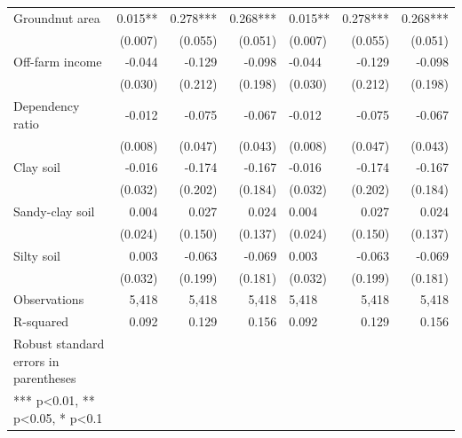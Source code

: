 \documentclass[
]{article}
\begin{document}
\begin{longtable}[t]{lrrrlrr}
Groundnut area & 0.015** & 0.278*** & 0.268*** & 0.015** & 0.278*** & 0.268***\\
 & (0.007) & (0.055) & (0.051) & (0.007) & (0.055) & (0.051)\\
Off-farm income & -0.044 & -0.129 & -0.098 & -0.044 & -0.129 & -0.098\\
 & (0.030) & (0.212) & (0.198) & (0.030) & (0.212) & (0.198)\\
Dependency ratio & -0.012 & -0.075 & -0.067 & -0.012 & -0.075 & -0.067\\
 & (0.008) & (0.047) & (0.043) & (0.008) & (0.047) & (0.043)\\
Clay soil & -0.016 & -0.174 & -0.167 & -0.016 & -0.174 & -0.167\\
 & (0.032) & (0.202) & (0.184) & (0.032) & (0.202) & (0.184)\\
Sandy-clay soil & 0.004 & 0.027 & 0.024 & 0.004 & 0.027 & 0.024\\
 & (0.024) & (0.150) & (0.137) & (0.024) & (0.150) & (0.137)\\
Silty soil & 0.003 & -0.063 & -0.069 & 0.003 & -0.063 & -0.069\\
 & (0.032) & (0.199) & (0.181) & (0.032) & (0.199) & (0.181)\\
Observations & 5,418 & 5,418 & 5,418 & 5,418 & 5,418 & 5,418\\
R-squared & 0.092 & 0.129 & 0.156 & 0.092 & 0.129 & 0.156\\
Robust standard errors in parentheses &  &  &  &  &  & \\
*** p<0.01, ** p<0.05, * p<0.1 &  &  &  &  &  & \\*
\end{longtable}
\endgroup{}
\end{document}
